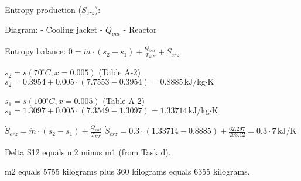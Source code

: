 Entropy production (\( \dot{S}_{erz} \)):  

Diagram:  
- Cooling jacket  
- \( \dot{Q}_{out} \)  
- Reactor  

Entropy balance:  
\( 0 = \dot{m} \cdot (s_2 - s_1) + \frac{\dot{Q}_{out}}{T_{KF}} + \dot{S}_{erz} \)  

\( s_2 = s(70^\circ C, x = 0.005) \) (Table A-2)  
\( s_2 = 0.3954 + 0.005 \cdot (7.7553 - 0.3954) = 0.8885 \, \text{kJ/kg·K} \)  

\( s_1 = s(100^\circ C, x = 0.005) \) (Table A-2)  
\( s_1 = 1.3097 + 0.005 \cdot (7.3549 - 1.3097) = 1.33714 \, \text{kJ/kg·K} \)  

\( \dot{S}_{erz} = \dot{m} \cdot (s_2 - s_1) + \frac{\dot{Q}_{out}}{T_{KF}} \)  
\( \dot{S}_{erz} = 0.3 \cdot (1.33714 - 0.8885) + \frac{62.297}{293.12} = 0.3 \cdot 7 \, \text{kJ/K} \)

Delta S12 equals m2 minus m1 (from Task d).  

m2 equals 5755 kilograms plus 360 kilograms equals 6355 kilograms.